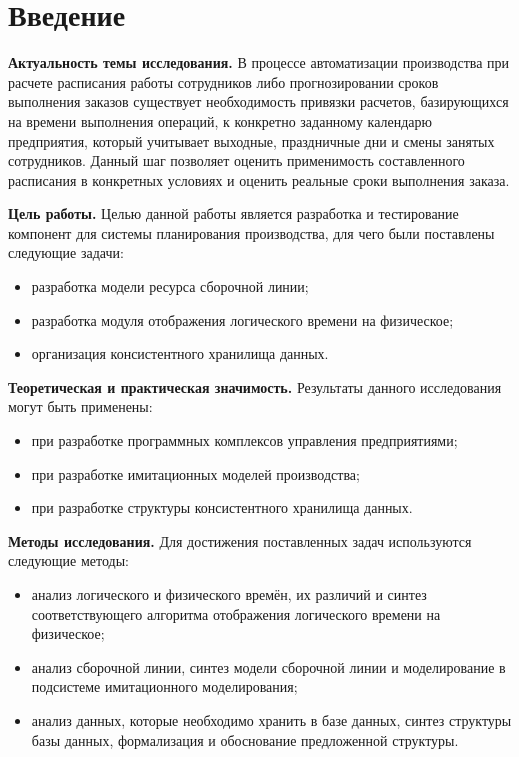 \section*{Введение}
\indent \textbf{Актуальность темы исследования.}
В процессе автоматизации производства при расчете расписания работы сотрудников либо прогнозировании сроков выполнения заказов существует необходимость привязки расчетов, базирующихся на времени выполнения операций, к конкретно заданному календарю предприятия, который учитывает выходные, праздничные дни и смены занятых сотрудников.
Данный шаг позволяет оценить применимость составленного расписания в конкретных условиях и оценить реальные сроки выполнения заказа.


\indent \textbf{Цель работы.} 
Целью данной работы является разработка и тестирование компонент для системы планирования производства, для чего были поставлены следующие задачи:
\begin{itemize}
	\item разработка модели ресурса сборочной линии;
	\item разработка модуля отображения логического времени на физическое;
	\item организация консистентного хранилища данных.
\end{itemize}

\indent \textbf{Теоретическая и практическая значимость.}
Результаты данного исследования могут быть применены:
\begin{itemize}
	\item при разработке программных комплексов управления предприятиями;
	\item при разработке имитационных моделей производства;
	\item при разработке структуры консистентного хранилища данных.
\end{itemize}

\indent \textbf{Методы исследования.}
Для достижения поставленных задач используются следующие методы:
\begin{itemize}
	\item анализ логического и физического времён, их различий и синтез соответствующего алгоритма отображения логического времени на физическое;
	\item анализ сборочной линии, синтез модели сборочной линии и моделирование в подсистеме имитационного моделирования;
	\item анализ данных, которые необходимо хранить в базе данных, синтез структуры базы данных, формализация и обоснование предложенной структуры.
\end{itemize}

